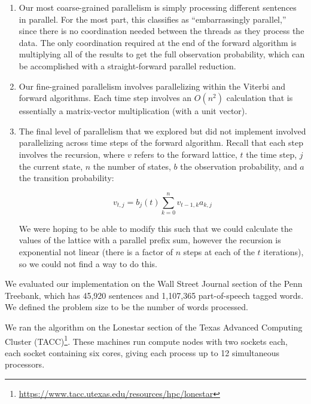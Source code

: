 \documentclass[11pt,onecolumn]{article}
\begin{document}
\begin{enumerate}
  \item Our most coarse-grained parallelism is simply processing different sentences in parallel. For the most part, this classifies as ``embarrassingly parallel,'' since there is no coordination needed between the threads as they process the data. The only coordination required at the end of the forward algorithm is multiplying all of the results to get the full observation probability, which can be accomplished with a straight-forward parallel reduction.

  \item Our fine-grained parallelism involves parallelizing within the Viterbi and forward algorithms. Each time step involves an $O(n^2)$ calculation that is essentially a matrix-vector multiplication (with a unit vector).

\item The final level of parallelism that we explored but did not implement involved parallelizing across time steps of the forward algorithm. Recall that each step involves the recursion, where $v$ refers to the forward lattice, $t$ the time step, $j$ the current state, $n$ the number of states, $b$ the observation probability, and $a$ the transition probability:

  \begin{equation}
    v_{t,j} = b_j(t) \sum_{k=0}^n v_{t - 1, k} a_{k,j}
  \end{equation}

  We were hoping to be able to modify this such that we could calculate the values of the lattice with a parallel prefix sum, however the recursion is exponential not linear (there is a factor of $n$ steps at each of the $t$ iterations), so we could not find a way to do this.

\end{enumerate}


We evaluated our implementation on the Wall Street Journal section of the Penn Treebank, which has 45,920 sentences and 1,107,365 part-of-speech tagged words. We defined the problem size to be the number of words processed.

We ran the algorithm on the Lonestar section of the Texas Advanced Computing Cluster (TACC)\footnote{\url{https://www.tacc.utexas.edu/resources/hpc/lonestar}}. These machines run compute nodes with two sockets each, each socket containing six cores, giving each process up to 12 simultaneous processors.
\end{document}
